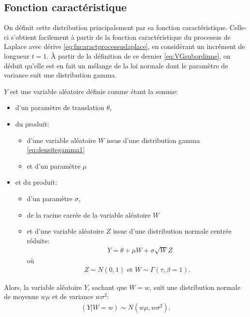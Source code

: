 \subsection{Fonction caractéristique}
\label{sec:fncaractGAL}

On définit cette distribution principalement par sa fonction
caractéristique. Celle-ci s'obtient facilement à partir de la fonction
caractéristique du processus de Laplace avec dérive
\eqref{eq:fncaractprocessuslaplace}, en considérant un incrément de
longueur $t=1$. À partir de la définition de ce dernier
\eqref{eq:VGsubordinne}, on déduit qu'elle est en fait un mélange de
la loi normale dont le paramètre de variance suit une distribution
gamma.

$Y$ est une variable aléatoire définie comme étant la somme:
\begin{itemize}
\item d'un paramètre de translation $\theta$,
\item du produit:
  \begin{itemize}
  \item d'une variable aléatoire $W$ issue d'une distribution gamma
    \eqref{eq:densitegamma1}
  \item et d'un paramètre $\mu$
  \end{itemize}
\item et du produit:
  \begin{itemize}
  \item d'un paramètre $\sigma$,
  \item de la racine carrée de la variable aléatoire $W$
  \item et d'une variable aléatoire $Z$ issue d'une distribution
    normale centrée réduite:
    \begin{align}
  		\label{eq:defvarY-GAL}
  		&Y = \theta + \mu W + \sigma \sqrt{W} Z
	\end{align}
	où 
	\begin{align}
  		Z \sim N(0,1) \mbox{ et } W \sim \Gamma(\tau,\beta=1). \nonumber
	\end{align}
  \end{itemize}
\end{itemize}

Alors, la variable aléatoire $Y$, sachant que $W=w$, suit une
distribution normale de moyenne $w\mu$ et de variance $w\sigma^2$:
\begin{align}
  \label{eq:Ynormalconditionnel}
  (Y|W=w) \sim N(w\mu,w\sigma^2).
\end{align}

